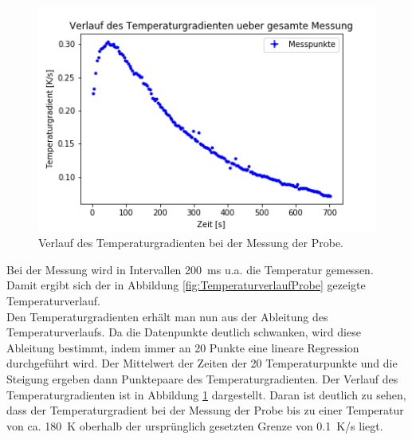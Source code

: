 \documentclass[12pt,a4paper]{article}
\begin{document}
\begin{figure}
\centering
\includegraphics[scale=1]{Bilder/Haupt_Probe/Temperaturgradient_Verlauf.png}
\caption[test]{Verlauf des Temperaturgradienten bei der Messung der Probe.}
\label{fig:TemperaturgradientverlaufProbe}
\end{figure}

Bei der Messung wird in Intervallen \SI{200}{ms} u.a. die Temperatur gemessen. Damit ergibt sich der in Abbildung \ref{fig:TemperaturverlaufProbe} gezeigte Temperaturverlauf. \\
Den Temperaturgradienten erhält man nun aus der Ableitung des Temperaturverlaufs. Da die Datenpunkte deutlich schwanken, wird diese Ableitung bestimmt, indem immer an 20 Punkte eine lineare Regression durchgeführt wird. Der Mittelwert der Zeiten der 20 Temperaturpunkte und die Steigung ergeben dann Punktepaare des Temperaturgradienten. Der Verlauf des Temperaturgradienten ist in Abbildung \ref{fig:TemperaturgradientverlaufProbe} dargestellt. Daran ist deutlich zu sehen, dass der Temperaturgradient bei der Messung der Probe bis zu einer Temperatur von ca. \SI{180}{K} oberhalb der ursprünglich gesetzten Grenze von \SI{0,1}{K/s} liegt.
\end{document}
